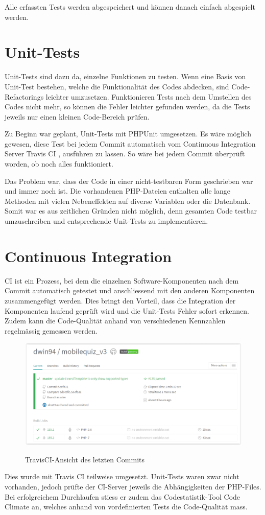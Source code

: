 Alle erfassten Tests werden abgespeichert und können danach einfach abgespielt werden.


\section{Unit-Tests}
Unit-Tests sind dazu da, einzelne Funktionen zu testen. Wenn eine Basis von Unit-Test bestehen, welche die Funktionalität des Codes abdecken, sind Code-\gls{Refactoring}s leichter umzusetzen. Funktionieren Tests nach dem Umstellen des Codes nicht mehr, so können die Fehler leichter gefunden werden, da die Tests jeweils nur einen kleinen Code-Bereich prüfen.

Zu Beginn war geplant, Unit-Tests mit PHPUnit \cite{phpunit} umgesetzen. Es wäre möglich gewesen, diese Test bei jedem \gls{Commit} automatisch vom Continuous Integration Server Travis CI \cite{travisCI}, ausführen zu lassen. So wäre bei jedem \gls{Commit} überprüft worden, ob noch alles funktioniert.

Das Problem war, dass der Code in einer nicht-testbaren Form geschrieben war und immer noch ist. Die vorhandenen PHP-Dateien enthalten alle lange Methoden mit vielen Nebeneffekten auf diverse Variablen oder die Datenbank. Somit war es aus zeitlichen Gründen nicht möglich, denn gesamten Code testbar umzuschreiben und entsprechende Unit-Tests zu implementieren.



\section{Continuous Integration}
\acrfull{CI} ist ein Prozess, bei dem die einzelnen Software-Komponenten nach dem \gls{Commit} automatisch getestet und anschliessend mit den anderen Komponenten zusammengefügt werden. Dies bringt den Vorteil, dass die Integration der Komponenten laufend geprüft wird und die Unit-Tests Fehler sofort erkennen. Zudem kann die Code-Qualität anhand von verschiedenen Kennzahlen regelmässig gemessen werden.


\begin{figure}[H]
	\centering
	\includegraphics[width=1\textwidth]{Images/travisCI.PNG}
	\caption{TravisCI-Ansicht des letzten Commits}
	\cite{travisCI}
\end{figure}


Dies wurde mit Travis CI \cite{travisCI} teilweise umgesetzt. Unit-Tests waren zwar nicht vorhanden, jedoch prüfte der \acrshort{CI}-Server jeweils die Abhängigkeiten der PHP-Files. Bei erfolgreichem Durchlaufen stiess er zudem das Codestatistik-Tool Code Climate \cite{codeclimate} an, welches anhand von vordefinierten Tests die Code-Qualität mass.
